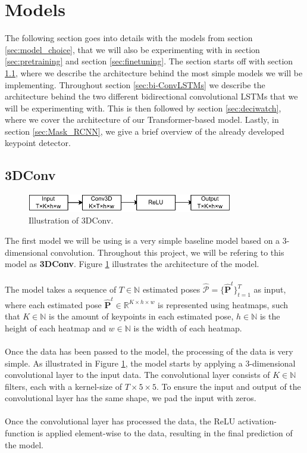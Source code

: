 \documentclass[./main.tex]{subfiles}
\begin{document}
\section{Models}
\label{sec:models}
The following section goes into details with the models from section \ref{sec:model_choice}, that we will also be experimenting with in section \ref{sec:pretraining} and section \ref{sec:finetuning}. The section starts off with section \ref{sec:3DConv}, where we describe the architecture behind the most simple models we will be implementing. Throughout section \ref{sec:bi-ConvLSTMs} we describe the architecture behind the two different bidirectional convolutional LSTMs that we will be experimenting with. This is then followed by section \ref{sec:deciwatch}, where we cover the architecture of our Transformer-based model. Lastly, in section \ref{sec:Mask_RCNN}, we give a brief overview of the already developed keypoint detector.

\subsection{3DConv}
\label{sec:3DConv}
\begin{figure}[htbp]
    \centering
    \includegraphics[width=0.8\textwidth]{./entities/baseline.pdf}
    \caption{Illustration of 3DConv.}
    \label{fig:baseline}
\end{figure}

\noindent The first model we will be using is a very simple baseline model based on a 3-dimensional convolution. Throughout this project, we will be refering to this model as \textbf{3DConv}. Figure \ref{fig:baseline} illustrates the architecture of the model.
\\
\\
The model takes a sequence of $T \in \mathbb{N}$ estimated poses $\hat{\mathcal{P}} = \{\hat{\bm{P}}^t\}_{t = 1} ^T$ as input, where each estimated pose $\hat{\bm{P}}^t \in \mathbb{R}^{K \times h \times w}$ is represented using heatmaps, such that $K \in \mathbb{N}$ is the amount of keypoints in each estimated pose, $h \in \mathbb{N}$ is the height of each heatmap and $w \in \mathbb{N}$ is the width of each heatmap.
\\
\\
Once the data has been passed to the model, the processing of the data is very simple. As illustrated in Figure \ref{fig:baseline}, the model starts by applying a 3-dimensional convolutional layer to the input data. The convolutional layer consists of $K \in \mathbb{N}$ filters, each with a kernel-size of $T \times 5 \times 5$. To ensure the input and output of the convolutional layer has the same shape, we pad the input with zeros.
\\
\\
Once the convolutional layer has processed the data, the ReLU activation-function is applied element-wise to the data, resulting in the final prediction of the model.
\end{document}
